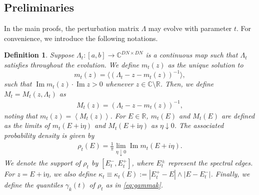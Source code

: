 \documentclass[10pt,reqno]{amsart}
\numberwithin{equation}{section}
\numberwithin{figure}{section}
\theoremstyle{plain} %
\newtheorem{definition}[theorem]{Definition}
\theoremstyle{definition} %
\newcommand{\R}{\mathbb{R}}
\newcommand{\C}{\mathbb{C}}
\newcommand{\ii}{\mathrm{i}}
\newcommand{\pa}[1]{\left({#1}\right)}
\DeclareMathOperator{\im}{\mathrm{Im}}
\newcommand{\be}{\begin{equation}}
\newcommand{\ee}{\end{equation}}
\numberwithin{equation}{section}
\begin{document}
\subsection{Preliminaries}
In the main proofs, the perturbation matrix $\Lambda$ may evolve with parameter $t$. For convenience, we introduce the following notations.

\begin{definition}\label{def_moving_Lambda}
    Suppose $\Lambda_t:[a, b] \rightarrow \mathbb{C}^{D N \times D N}$ is a continuous map such that $\Lambda_t$ satisfies  throughout the evolution. 
     We define $m_t(z)$ as the unique solution to 
 \be\nonumber
m_t(z)= \big\langle \left(\Lambda_t -z- m_t(z)\right)^{-1} \big\rangle ,
\ee
such that $\im m_t(z)\cdot\im z>0$ whenever $z\in \C\setminus\R$.
Then, we define $M_t=M_t\pa{z,\Lambda_t}$ as
\begin{equation}\nonumber
        \begin{aligned}
            M_t(z)=
            \left(\Lambda_t-z-m_t(z)\right)^{-1},
        \end{aligned}
    \end{equation}
noting that $m_t(z)=\left\langle M_t(z)\right\rangle$. For $E\in\R$, $m_t(E)$ and $M_t(E)$ are defined as the limits of $m_t(E+\ii\eta)$ and $M_t(E+\ii\eta)$ as $\eta\downarrow 0$. 
The associated probability density is given by
    \begin{equation}\nonumber
        \begin{aligned}
            \rho_t(E)=\frac{1}{\pi} \lim _{\eta \downarrow 0} \operatorname{Im} m_t(E+i \eta).
        \end{aligned}
    \end{equation}
We denote the support of $\rho_t$ by $\left[E_t^{-}, E_t^{+}\right]$, where $E_t^{\pm}$ represent the spectral edges. For $z=E+\ii \eta$, we also define $ \kappa_t\equiv \kappa_t(E):=|E_t^{+}-E|\wedge |E-E_t^{-}|$. Finally, we define the quantiles $\gamma_k\pa{t}$ of $\rho_t$ as in \eqref{eq:gammak}.
\end{definition}
\end{document}

